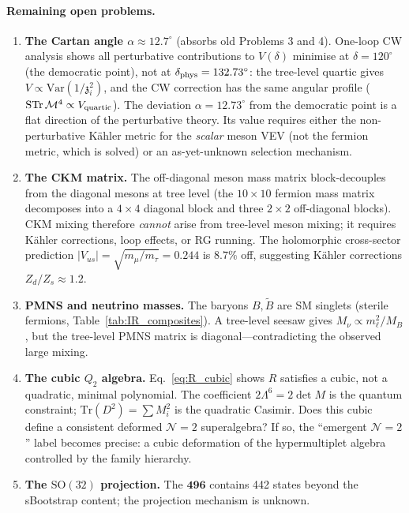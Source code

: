 \documentclass[aps,prd,twocolumn,showpacs,preprintnumbers,superscriptaddress,floatfix]{revtex4-2}
\newcommand{\SO}{\mathrm{SO}}
\newcommand{\Tr}{\mathrm{Tr}}
\newcommand{\zch}{\mathfrak{z}}
\begin{document}
\paragraph{Remaining open problems.}
\begin{enumerate}
\item \textbf{The Cartan angle $\alpha \approx 12.7^\circ$}
  (absorbs old Problems 3 and 4).
  One-loop CW analysis shows all perturbative contributions to
  $V(\delta)$ minimise at $\delta = 120^\circ$ (the democratic
  point), not at $\delta_{\rm phys} = 132.73^\circ$: the
  tree-level quartic gives
  $V \propto \mathrm{Var}(1/\zch_i^2)$, and the CW correction
  has the same angular profile
  ($\mathrm{STr}\,\mathcal{M}^4 \propto V_{\rm quartic}$).
  The deviation $\alpha = 12.73^\circ$ from the democratic
  point is a flat direction of the perturbative theory.
  Its value requires either the non-perturbative K\"ahler
  metric for the \emph{scalar} meson VEV (not the fermion
  metric, which is solved) or an as-yet-unknown selection
  mechanism.

\item \textbf{The CKM matrix.}
  The off-diagonal meson mass matrix block-decouples from the
  diagonal mesons at tree level (the $10 \times 10$ fermion
  mass matrix decomposes into a $4 \times 4$ diagonal block
  and three $2 \times 2$ off-diagonal blocks).
  CKM mixing therefore \emph{cannot} arise from tree-level
  meson mixing; it requires K\"ahler corrections, loop effects,
  or RG running.
  The holomorphic cross-sector prediction
  $|V_{us}| = \sqrt{m_\mu/m_\tau} = 0.244$ is $8.7\%$ off,
  suggesting K\"ahler corrections $Z_d/Z_s \approx 1.2$.

\item \textbf{PMNS and neutrino masses.}
  The baryons $B, \tilde{B}$ are SM singlets (sterile fermions,
  Table~\ref{tab:IR_composites}).
  A tree-level seesaw gives $M_\nu \propto m_\ell^2/M_B$, but
  the tree-level PMNS matrix is diagonal---contradicting the
  observed large mixing.

\item \textbf{The cubic $Q_2$ algebra.}
  Eq.~\eqref{eq:R_cubic} shows $R$ satisfies a cubic, not a
  quadratic, minimal polynomial.
  The coefficient $2\Lambda^6 = 2\det M$ is the quantum
  constraint; $\Tr(D^2) = \sum M_i^2$ is the quadratic
  Casimir.
  Does this cubic define a consistent deformed
  $\mathcal{N}{=}2$ superalgebra?
  If so, the ``emergent $\mathcal{N}{=}2$'' label becomes
  precise: a cubic deformation of the hypermultiplet algebra
  controlled by the family hierarchy.

\item \textbf{The $\SO(32)$ projection.}
  The $\mathbf{496}$ contains 442 states beyond the sBootstrap
  content; the projection mechanism is unknown.
\end{enumerate}
\end{document}
